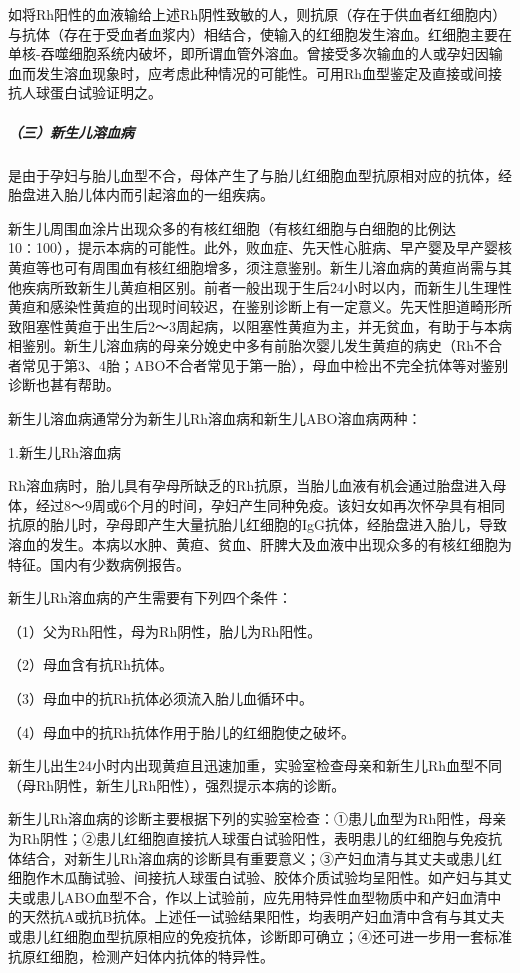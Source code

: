 如将Rh阳性的血液输给上述Rh阴性致敏的人，则抗原（存在于供血者红细胞内）与抗体（存在于受血者血浆内）相结合，使输入的红细胞发生溶血。红细胞主要在单核-吞噬细胞系统内破坏，即所谓血管外溶血。曾接受多次输血的人或孕妇因输血而发生溶血现象时，应考虑此种情况的可能性。可用Rh血型鉴定及直接或间接抗人球蛋白试验证明之。

\subparagraph{（三）新生儿溶血病}

是由于孕妇与胎儿血型不合，母体产生了与胎儿红细胞血型抗原相对应的抗体，经胎盘进入胎儿体内而引起溶血的一组疾病。

新生儿周围血涂片出现众多的有核红细胞（有核红细胞与白细胞的比例达10∶100），提示本病的可能性。此外，败血症、先天性心脏病、早产婴及早产婴核黄疸等也可有周围血有核红细胞增多，须注意鉴别。新生儿溶血病的黄疸尚需与其他疾病所致新生儿黄疸相区别。前者一般出现于生后24小时以内，而新生儿生理性黄疸和感染性黄疸的出现时间较迟，在鉴别诊断上有一定意义。先天性胆道畸形所致阻塞性黄疸于出生后2～3周起病，以阻塞性黄疸为主，并无贫血，有助于与本病相鉴别。新生儿溶血病的母亲分娩史中多有前胎次婴儿发生黄疸的病史（Rh不合者常见于第3、4胎；ABO不合者常见于第一胎），母血中检出不完全抗体等对鉴别诊断也甚有帮助。

新生儿溶血病通常分为新生儿Rh溶血病和新生儿ABO溶血病两种：

\hypertarget{text00260.htmlux5cux23CHP33-5-4-1-2-3-1}{}
1.新生儿Rh溶血病

Rh溶血病时，胎儿具有孕母所缺乏的Rh抗原，当胎儿血液有机会通过胎盘进入母体，经过8～9周或6个月的时间，孕妇产生同种免疫。该妇女如再次怀孕具有相同抗原的胎儿时，孕母即产生大量抗胎儿红细胞的IgG抗体，经胎盘进入胎儿，导致溶血的发生。本病以水肿、黄疸、贫血、肝脾大及血液中出现众多的有核红细胞为特征。国内有少数病例报告。

新生儿Rh溶血病的产生需要有下列四个条件：

（1）父为Rh阳性，母为Rh阴性，胎儿为Rh阳性。

（2）母血含有抗Rh抗体。

（3）母血中的抗Rh抗体必须流入胎儿血循环中。

（4）母血中的抗Rh抗体作用于胎儿的红细胞使之破坏。

新生儿出生24小时内出现黄疸且迅速加重，实验室检查母亲和新生儿Rh血型不同（母Rh阴性，新生儿Rh阳性），强烈提示本病的诊断。

新生儿Rh溶血病的诊断主要根据下列的实验室检查：①患儿血型为Rh阳性，母亲为Rh阴性；②患儿红细胞直接抗人球蛋白试验阳性，表明患儿的红细胞与免疫抗体结合，对新生儿Rh溶血病的诊断具有重要意义；③产妇血清与其丈夫或患儿红细胞作木瓜酶试验、间接抗人球蛋白试验、胶体介质试验均呈阳性。如产妇与其丈夫或患儿ABO血型不合，作以上试验前，应先用特异性血型物质中和产妇血清中的天然抗A或抗B抗体。上述任一试验结果阳性，均表明产妇血清中含有与其丈夫或患儿红细胞血型抗原相应的免疫抗体，诊断即可确立；④还可进一步用一套标准抗原红细胞，检测产妇体内抗体的特异性。

